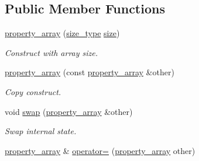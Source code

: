 \subsection*{\-Public \-Member \-Functions}
\begin{DoxyCompactItemize}
\item 
\hyperlink{classlb_1_1property__array_a28d12e06a6b58f36bf22f33a1c56c798}{property\-\_\-array} (\hyperlink{classlb_1_1property__array_a76d861a6fb4b99128f627ad951918429}{size\-\_\-type} \hyperlink{classlb_1_1property__array_aef6d4478adf6211fde06520d0802c5c2}{size})
\begin{DoxyCompactList}\small\item\em \-Construct with array size. \end{DoxyCompactList}\item 
\hypertarget{classlb_1_1property__array_a6c874c145a02e549fa1c65f95da8cb75}{\hyperlink{classlb_1_1property__array_a6c874c145a02e549fa1c65f95da8cb75}{property\-\_\-array} (const \hyperlink{classlb_1_1property__array}{property\-\_\-array} \&other)}\label{classlb_1_1property__array_a6c874c145a02e549fa1c65f95da8cb75}

\begin{DoxyCompactList}\small\item\em \-Copy construct. \end{DoxyCompactList}\item 
\hypertarget{classlb_1_1property__array_a37b9c38fd7a48aa3f8588863e3acaca7}{void \hyperlink{classlb_1_1property__array_a37b9c38fd7a48aa3f8588863e3acaca7}{swap} (\hyperlink{classlb_1_1property__array}{property\-\_\-array} \&other)}\label{classlb_1_1property__array_a37b9c38fd7a48aa3f8588863e3acaca7}

\begin{DoxyCompactList}\small\item\em \-Swap internal state. \end{DoxyCompactList}\item 
\hypertarget{classlb_1_1property__array_ac3262e1a44177d79edab91f7ce37b787}{\hyperlink{classlb_1_1property__array}{property\-\_\-array} \& \hyperlink{classlb_1_1property__array_ac3262e1a44177d79edab91f7ce37b787}{operator=} (\hyperlink{classlb_1_1property__array}{property\-\_\-array} other)}\label{classlb_1_1property__array_ac3262e1a44177d79edab91f7ce37b787}


\end{DoxyCompactItemize}
